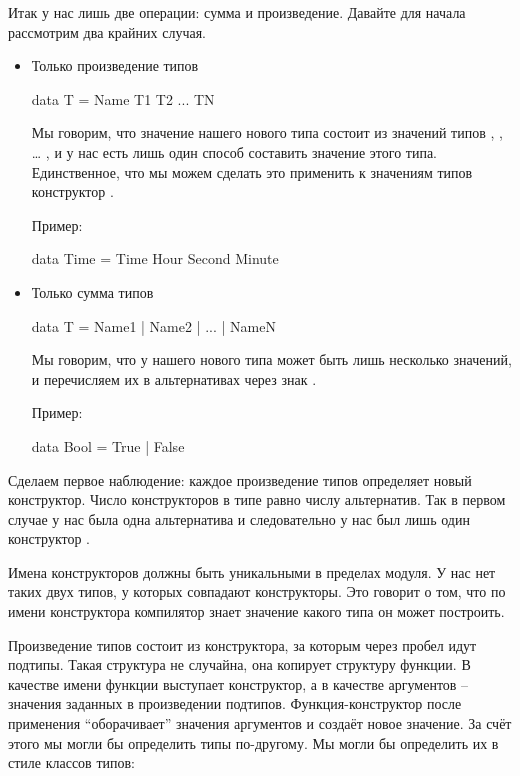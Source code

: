 Итак у нас лишь две операции: сумма и произведение. Давайте для начала
рассмотрим два крайних случая.

\begin{itemize}
\item
  Только произведение типов


  \begin{code}
  data T = Name T1 T2 ... TN
  \end{code}

  Мы говорим, что значение нашего нового типа  состоит из значений
  типов , , \ldots{} ,  и у нас есть лишь один
  способ составить значение этого типа. Единственное, что мы можем
  сделать это применить к значениям типов  конструктор .

  Пример:


  \begin{code}
  data Time = Time Hour Second Minute
  \end{code}
\item
  Только сумма типов


  \begin{code}
  data T = Name1 | Name2 | ... | NameN
  \end{code}

  Мы говорим, что у нашего нового типа  может быть лишь несколько
  значений, и перечисляем их в альтернативах через знак \In{|}.

  Пример:


  \begin{code}
  data Bool = True | False
  \end{code}
\end{itemize}

Сделаем первое наблюдение: каждое произведение типов определяет новый
конструктор. Число конструкторов в типе равно числу альтернатив. Так в
первом случае у нас была одна альтернатива и следовательно у нас был
лишь один конструктор .

Имена конструкторов должны быть уникальными в пределах модуля. У нас нет
таких двух типов, у которых совпадают конструкторы. Это говорит о том,
что по имени конструктора компилятор знает значение какого типа он может
построить.

Произведение типов состоит из конструктора, за которым через пробел идут
подтипы. Такая структура не случайна, она копирует структуру функции. В
качестве имени функции выступает конструктор, а в качестве аргументов --
значения заданных в произведении подтипов. Функция-конструктор после
применения ``оборачивает'' значения аргументов и создаёт новое значение.
За счёт этого мы могли бы определить типы по-другому. Мы могли бы
определить их в стиле классов типов:


